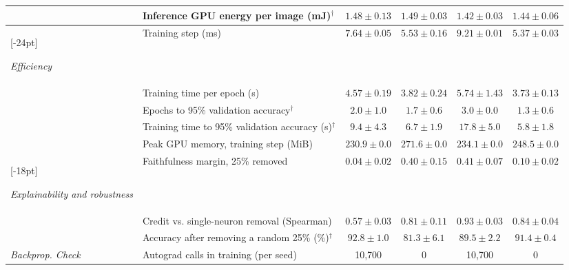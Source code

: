 \begin{table}[H]
\begin{tabular}{>{\raggedright\arraybackslash}p{2.1cm}>{\raggedright\arraybackslash}p{3.5cm}cccc}
 & Inference GPU energy per image (mJ)$^\dagger$ & $\boldsymbol{1.48 \pm 0.13}$ & $1.49 \pm 0.03$ & $\boldsymbol{1.42 \pm 0.03}$ & $1.44 \pm 0.06$ \\
\midrule
\multirow{5}{*}[-24pt]{\parbox[c]{2.1cm}{\raggedright\textit{Efficiency}}} & Training step (ms) & $7.64 \pm 0.05$ & $\boldsymbol{5.53 \pm 0.16}$ & $9.21 \pm 0.01$ & $\boldsymbol{5.37 \pm 0.03}$ \\
 & Training time per epoch (s) & $4.57 \pm 0.19$ & $\boldsymbol{3.82 \pm 0.24}$ & $5.74 \pm 1.43$ & $\boldsymbol{3.73 \pm 0.13}$ \\
 & Epochs to 95\% validation accuracy$^\dagger$ & $2.0 \pm 1.0$ & $\boldsymbol{1.7 \pm 0.6}$ & $3.0 \pm 0.0$ & $\boldsymbol{1.3 \pm 0.6}$ \\
 & Training time to 95\% validation accuracy (s)$^\dagger$ & $9.4 \pm 4.3$ & $\boldsymbol{6.7 \pm 1.9}$ & $17.8 \pm 5.0$ & $\boldsymbol{5.8 \pm 1.8}$ \\
 & Peak GPU memory, training step (MiB) & $\boldsymbol{230.9 \pm 0.0}$ & $271.6 \pm 0.0$ & $\boldsymbol{234.1 \pm 0.0}$ & $248.5 \pm 0.0$ \\
\midrule
\multirow{3}{*}[-18pt]{\parbox[c]{2.1cm}{\raggedright\textit{Explainability and robustness}}} & Faithfulness margin, 25\% removed & $0.04 \pm 0.02$ & $\boldsymbol{0.40 \pm 0.15}$ & $\boldsymbol{0.41 \pm 0.07}$ & $0.10 \pm 0.02$ \\
 & Credit vs. single-neuron removal (Spearman) & $0.57 \pm 0.03$ & $\boldsymbol{0.81 \pm 0.11}$ & $\boldsymbol{0.93 \pm 0.03}$ & $0.84 \pm 0.04$ \\
 & Accuracy after removing a random 25\% (\%)$^\dagger$ & $\boldsymbol{92.8 \pm 1.0}$ & $81.3 \pm 6.1$ & $89.5 \pm 2.2$ & $\boldsymbol{91.4 \pm 0.4}$ \\
\midrule
\textit{Backprop. Check} & Autograd calls in training (per seed) & 10{,}700 & 0 & 10{,}700 & 0 \\
\bottomrule
\end{tabular}
\end{table}

